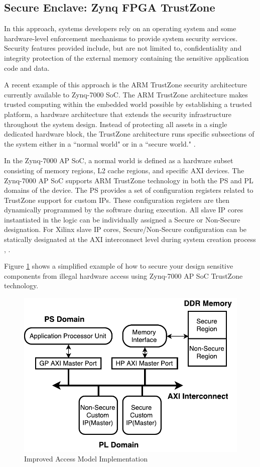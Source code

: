 \documentclass[sigconf]{acmart}
\theoremstyle{plain}
\theoremstyle{remark}
\begin{document}
\subsection{Secure Enclave: Zynq FPGA TrustZone}
In this approach, systems developers rely on an operating system and some hardware-level enforcement mechanisms to provide system security services. Security features provided include, but are not limited to, confidentiality and integrity protection of the external memory containing the sensitive application code and data.

A recent example of this approach is the ARM TrustZone security architecture currently available to Zynq-7000 SoC. The ARM TrustZone architecture makes trusted computing within the embedded world possible by establishing a trusted platform, a hardware architecture that extends the security infrastructure throughout the system design. Instead of protecting all assets in a single dedicated hardware block, the TrustZone architecture runs specific subsections of the system either in a ``normal world" or in a ``secure world." \cite{xilinxtrust}.

In the Zynq-7000 AP SoC, a normal world is defined as a hardware subset consisting of memory regions, L2 cache regions, and specific AXI devices. The Zynq-7000 AP SoC supports ARM TrustZone technology in both the PS and PL domains of the device. The PS provides a set of configuration registers related to TrustZone support for custom IPs. These configuration registers are then dynamically programmed by the software during execution. All slave IP cores instantiated in the logic can be individually assigned a Secure or Non-Secure designation. For Xilinx slave IP cores, Secure/Non-Secure configuration can be statically designated at the AXI interconnect level during system creation process \cite{xilinxprotrust}, \cite{xilinxtrust}.

Figure \ref{fig:trustzone} shows a simplified example of how to secure your design sensitive components from illegal hardware access using Zynq-7000 AP SoC TrustZone technology.

\begin{figure}[hbt]
\centering
\includegraphics[width=0.75\columnwidth]{figures/TrustZoneHardware.pdf}
\caption{Improved Access Model Implementation} %
\label{fig:trustzone}
\end{figure}
\end{document}
